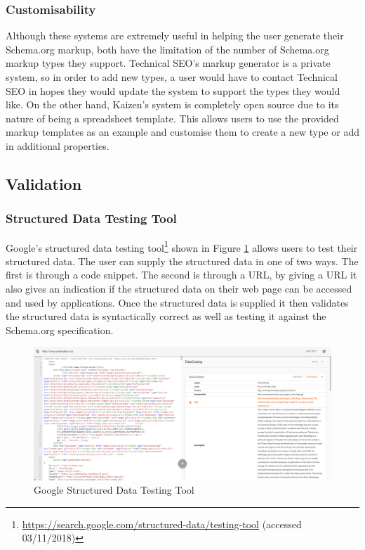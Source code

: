 \subsubsection*{Customisability}\label{sec:customisability}
Although these systems are extremely useful in helping the user generate their Schema.org markup, both have the limitation of the number of Schema.org markup types they support. Technical SEO's markup generator is a private system, so in order to add new types, a user would have to contact Technical SEO in hopes they would update the system to support the types they would like. On the other hand, Kaizen's system is completely open source due to its nature of being a spreadsheet template. This allows users to use the provided markup templates as an example and customise them to create a new type or add in additional properties.

\subsection{Validation}
\subsubsection*{Structured Data Testing Tool}
Google's structured data testing tool\footnote{\url{https://search.google.com/structured-data/testing-tool} (accessed 03/11/2018)} shown in Figure \ref{fig:googleTool} allows users to test their structured data. The user can supply the structured data in one of two ways. The first is through a code snippet. The second is through a URL, by giving a URL it also gives an indication if the structured data on their web page can be accessed and used by applications. Once the structured data is supplied it then validates the structured data is syntactically correct as well as testing it against the Schema.org specification.\newline

\begin{figure}[h]
 \centering\includegraphics[scale=0.35]{images/google_testing.PNG}
   \caption{Google Structured Data Testing Tool}
   \label{fig:googleTool}
\end{figure}

